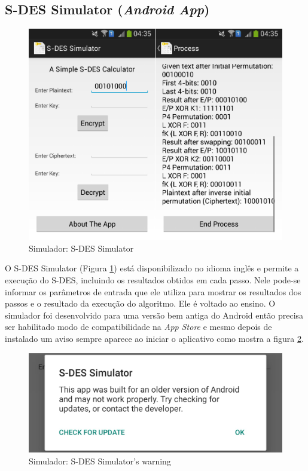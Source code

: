 \subsection{S-DES Simulator (\textit{Android App})}

\begin{figure}[H]
    \centering
    \caption{Simulador: S-DES Simulator}
    \label{fig:sdessimulatorapp}
    \includegraphics[width=.75\linewidth]{Simuladores/SDESSimulatorApp.png}
\end{figure}

O S-DES Simulator (Figura \ref{fig:sdessimulatorapp}) está disponibilizado no idioma inglês e permite a execução do S-DES, incluindo os resultados obtidos em cada passo. Nele pode-se informar os parâmetros de entrada que ele utiliza para mostrar os resultados dos passos e o resultado da execução do algoritmo. Ele é voltado ao ensino. O simulador foi desenvolvido para uma versão bem antiga do Android então precisa ser habilitado modo de compatibilidade na \textit{App Store} e mesmo depois de instalado um aviso sempre aparece ao iniciar o aplicativo como mostra a figura \ref{fig:sdessimulatorappwarning}. \cite{mountogiannakis15}

\begin{figure}[H]
    \centering
    \caption{Simulador: S-DES Simulator's warning}
    \label{fig:sdessimulatorappwarning}
    \includegraphics[width=.55\linewidth]{Simuladores/SDESSimulatorAppWarning.jpeg}
\end{figure}

